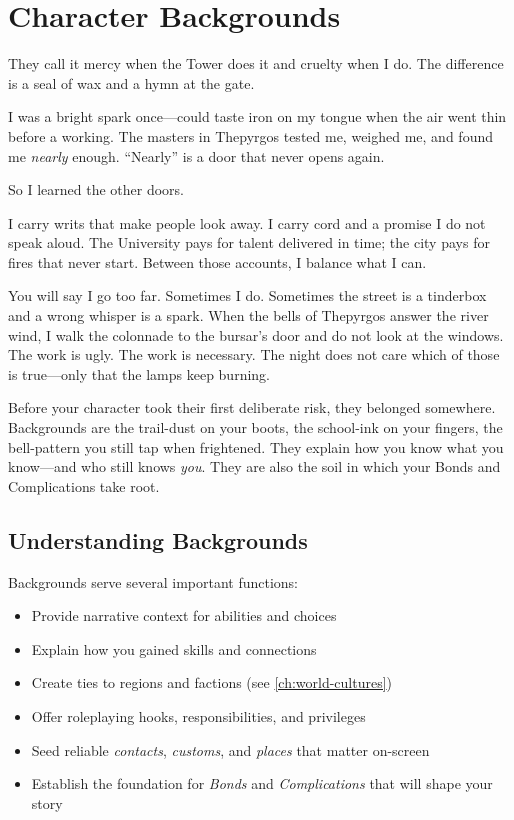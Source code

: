 \chapter{Character Backgrounds}
\label{ch:backgrounds}

\begin{tcolorbox}[colback=black!3!white,colframe=black!60!white,title={From the journal of a Thepyrgosi Witch Hunter},fonttitle=\bfseries,breakable]
They call it mercy when the Tower does it and cruelty when I do. The difference is a seal of wax and a hymn at the gate.

I was a bright spark once---could taste iron on my tongue when the air went thin before a working. The masters in Thepyrgos tested me, weighed me, and found me \emph{nearly} enough. ``Nearly'' is a door that never opens again.

So I learned the other doors.

I carry writs that make people look away. I carry cord and a promise I do not speak aloud. The University pays for talent delivered in time; the city pays for fires that never start. Between those accounts, I balance what I can.

You will say I go too far. Sometimes I do. Sometimes the street is a tinderbox and a wrong whisper is a spark. When the bells of Thepyrgos answer the river wind, I walk the colonnade to the bursar's door and do not look at the windows. The work is ugly. The work is necessary. The night does not care which of those is true---only that the lamps keep burning.
\end{tcolorbox}

Before your character took their first deliberate risk, they belonged somewhere. Backgrounds are the trail-dust on your boots, the school-ink on your fingers, the bell-pattern you still tap when frightened. They explain how you know what you know---and who still knows \emph{you}. They are also the soil in which your Bonds and Complications take root.

\section{Understanding Backgrounds}

Backgrounds serve several important functions:
\begin{itemize}
\item Provide narrative context for abilities and choices
\item Explain how you gained skills and connections
\item Create ties to regions and factions (see \ref{ch:world-cultures})
\item Offer roleplaying hooks, responsibilities, and privileges
\item Seed reliable \emph{contacts}, \emph{customs}, and \emph{places} that matter on-screen
\item Establish the foundation for \emph{Bonds} and \emph{Complications} that will shape your story
\end{itemize}

